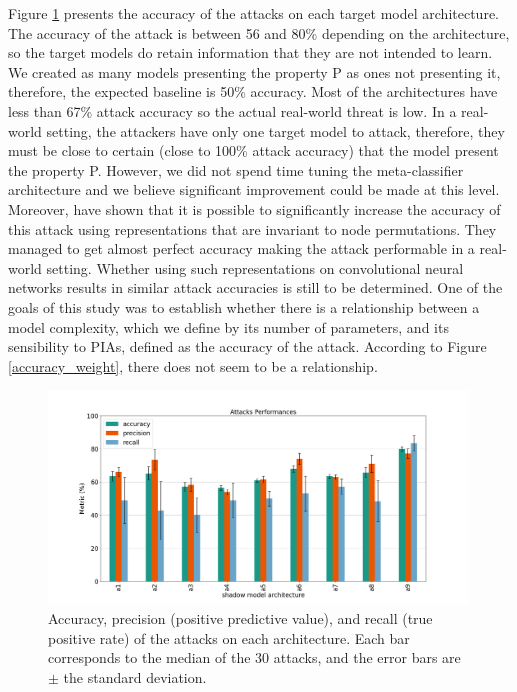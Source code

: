 \documentclass[11pt]{article}
\begin{document}
Figure \ref{accuracy_perf} presents the accuracy of the attacks on each target model architecture. The accuracy of the attack is between 56 and 80\% depending on the architecture, so the target models do retain information that they are not intended to learn. We created as many models presenting the property P as ones not presenting it, therefore, the expected baseline is 50\% accuracy. Most of the architectures have less than 67\% attack accuracy so the actual real-world threat is low. In a real-world setting, the attackers have only one target model to attack, therefore, they must be close to certain (close to 100\% attack accuracy) that the model present the property P. However, we did not spend time tuning the meta-classifier architecture and we believe significant improvement could be made at this level. Moreover, \citet{Ganju2018} have shown that it is possible to significantly increase the accuracy of this attack using representations that are invariant to node permutations. They managed to get almost perfect accuracy making the attack performable in a real-world setting. Whether using such representations on convolutional neural networks results in similar attack accuracies is still to be determined. One of the goals of this study was to establish whether there is a relationship between a model complexity, which we define by its number of parameters, and its sensibility to PIAs, defined as the accuracy of the attack. According to Figure \ref{accuracy_weight}, there does not seem to be a relationship.\\ 

\begin{figure}[h!]
    \centering
    \begin{minipage}{\textwidth}
        \centering
        \includegraphics[width=0.99\textwidth]{accuracy_perf.png} %
        \caption{Accuracy, precision (positive predictive value), and recall (true positive rate) of the attacks on each architecture. Each bar corresponds to the median of the 30 attacks, and the error bars are $\pm$ the standard deviation.}
        \label{accuracy_perf}
    \end{minipage}\hfill
\end{figure}
\end{document}
